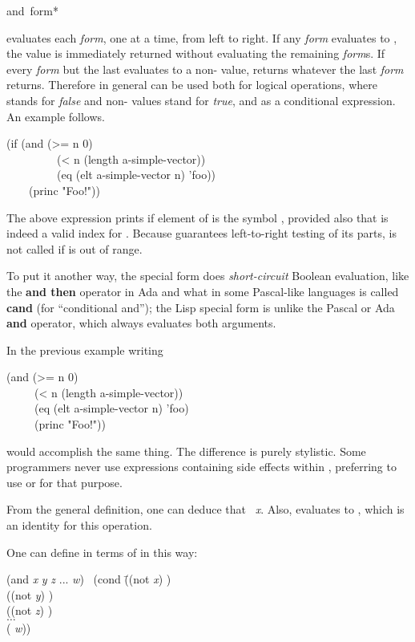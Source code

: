 \begin{defmac}
and {\,form}*

 evaluates each {\it form}, one at a time,
from left to right.  If any {\it form} evaluates to {\false}, the value {\nil}
is immediately returned without evaluating the remaining
{\it form\/}s.  If every {\it form} but the last evaluates to a non-{\false} value,
 returns whatever the last {\it form} returns.
Therefore in general  can be used both for logical operations,
where {\false} stands for {\it false} and non-{\false} values stand for {\it true},
and as a conditional expression.
An example follows.
\begin{lisp}
(if (and (>= n 0) \\
~~~~~~~~~(< n (length a-simple-vector)) \\
~~~~~~~~~(eq (elt a-simple-vector n) 'foo)) \\
~~~~(princ "Foo!"))
\end{lisp}
The above expression prints  if element  of 
is the symbol , provided also that  is indeed a valid index
for .  Because  guarantees left-to-right testing
of its parts,  is not called if  is out of range.

To put it another way,
the  special form does {\it short-circuit} Boolean evaluation,
like the {\bf and then} operator in Ada
and what in some Pascal-like languages is called {\bf cand} (for ``conditional
and''); the Lisp  special form is
unlike the Pascal or Ada {\bf and} operator,
which always evaluates both arguments.

In the previous example writing
\begin{lisp}
(and (>= n 0) \\
~~~~~(< n (length a-simple-vector)) \\
~~~~~(eq (elt a-simple-vector n) 'foo) \\
~~~~~(princ "Foo!"))
\end{lisp}
would accomplish the same thing.  The difference is purely stylistic.
Some programmers never use expressions containing side effects
within , preferring to use  or  for that purpose.

From the general definition, one can deduce that
 \EQ\ {\it x}.  Also,
 evaluates to {\true}, which is an identity for this operation.

One can define  in terms of  in this way:
\begin{lisp}
(and {\it x} {\it y} {\it z} ... {\it w}) \EQ\ (cond \=((not {\it x}) {\false}) \\
\>((not {\it y}) {\false}) \\
\>((not {\it z}) {\false}) \\
\>$\ldots$ \\
\>({\true} {\it w}))
\end{lisp}


\end{defmac}
